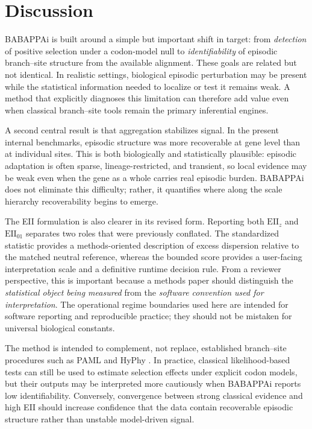 \documentclass[11pt]{article}
\begin{document}
\section{Discussion}

BABAPPAi is built around a simple but important shift in target: from \emph{detection} of positive selection under a codon-model null to \emph{identifiability} of episodic branch--site structure from the available alignment. These goals are related but not identical. In realistic settings, biological episodic perturbation may be present while the statistical information needed to localize or test it remains weak. A method that explicitly diagnoses this limitation can therefore add value even when classical branch--site tools remain the primary inferential engines.

A second central result is that aggregation stabilizes signal. In the present internal benchmarks, episodic structure was more recoverable at gene level than at individual sites. This is both biologically and statistically plausible: episodic adaptation is often sparse, lineage-restricted, and transient, so local evidence may be weak even when the gene as a whole carries real episodic burden. BABAPPAi does not eliminate this difficulty; rather, it quantifies where along the scale hierarchy recoverability begins to emerge.

The EII formulation is also clearer in its revised form. Reporting both $\mathrm{EII}_{z}$ and $\mathrm{EII}_{01}$ separates two roles that were previously conflated. The standardized statistic provides a methods-oriented description of excess dispersion relative to the matched neutral reference, whereas the bounded score provides a user-facing interpretation scale and a definitive runtime decision rule. From a reviewer perspective, this is important because a methods paper should distinguish the \emph{statistical object being measured} from the \emph{software convention used for interpretation}. The operational regime boundaries used here are intended for software reporting and reproducible practice; they should not be mistaken for universal biological constants.

The method is intended to complement, not replace, established branch--site procedures such as PAML and HyPhy \cite{Yang2007,Murrell2012,KosakovskyPond2011,KosakovskyPond2020}. In practice, classical likelihood-based tests can still be used to estimate selection effects under explicit codon models, but their outputs may be interpreted more cautiously when BABAPPAi reports low identifiability. Conversely, convergence between strong classical evidence and high EII should increase confidence that the data contain recoverable episodic structure rather than unstable model-driven signal.
\end{document}
